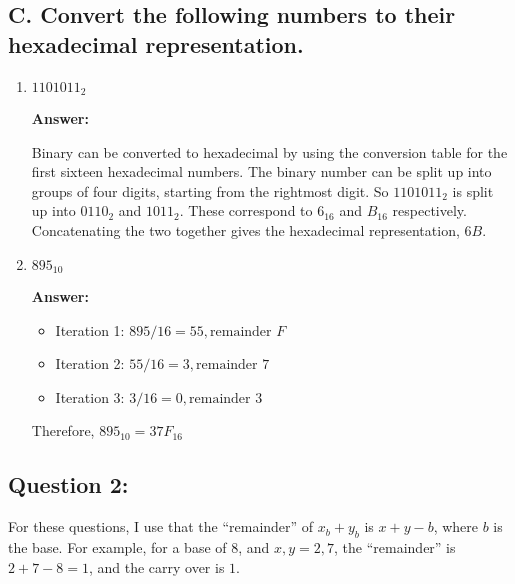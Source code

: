 \documentclass[12pt]{extreport}
\newcommand{\answer}[0]{\medskip \textbf{Answer:} \medskip}
\begin{document}
\subsection*{C. Convert the following numbers to their hexadecimal representation.}

\begin{enumerate}
    
    \item \( 1101011_{2} \)
    
        \answer

        Binary can be converted to hexadecimal by using the conversion table for the first sixteen hexadecimal numbers. The binary number can be split up into groups of four digits, starting from the rightmost digit. So \( 1101011_{2} \) is split up into \( 0110_{2} \) and \( 1011_{2} \). These correspond to \( 6_{16} \) and \( B_{16} \) respectively. Concatenating the two together gives the hexadecimal representation, \( 6B \).

    \item \( 895_{10} \)
    
        \answer
        \begin{itemize}
            \item Iteration 1: \( 895 / 16 = 55, \text{remainder } F \)
            \item Iteration 2: \( 55 / 16 = 3, \text{remainder } 7 \)
            \item Iteration 3: \( 3 / 16 = 0, \text{remainder } 3 \)
        \end{itemize}

        Therefore, \( 895_{10} = 37F_{16} \)

\end{enumerate}
\newpage

\subsection*{Question 2:}

For these questions, I use that the ``remainder'' of \( x_{b} + y_{b} \) is \( x + y - b \), where \( b \) is the base. For example, for a base of 8, and \( x, y = 2, 7 \), the ``remainder'' is \( 2 + 7 - 8 = 1 \), and the carry over is \( 1 \).
\end{document}
